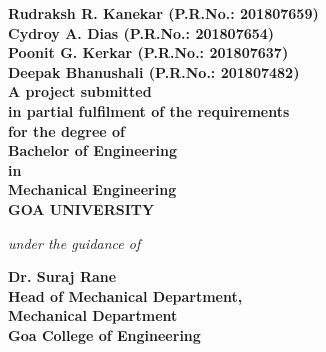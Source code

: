 \begin{center}
\begin{small}
\end{small}
\vspace{0.4cm}
\bfseries{Rudraksh R. Kanekar (P.R.No.: 201807659)\\Cydroy A. Dias (P.R.No.: 201807654)\\Poonit G. Kerkar (P.R.No.: 201807637)\\Deepak Bhanushali (P.R.No.: 201807482)}\\
\vspace{0.4cm}
A project submitted\\in partial fulfilment of the requirements\\for the degree  of\\Bachelor of Engineering\\in\\ Mechanical Engineering\\GOA UNIVERSITY\\
\vspace{0.4cm}
\begin{small}
\emph{under the guidance of}\\
\end{small}
\vspace{0.5cm}
{\bfseries \large Dr. Suraj Rane}\\
{\bfseries \large Head of Mechanical Department,\\Mechanical Department\\Goa College of Engineering}\\
\vspace{1cm}
\end{center}